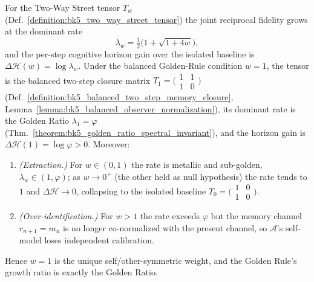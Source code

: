 \begin{theorem}
\label{theorem:bk5_golden_rule_reciprocity}
For the Two-Way Street tensor $T_w$
(Def.~\ref{definition:bk5_two_way_street_tensor}) the joint reciprocal fidelity grows
at the dominant rate
\[
\lambda_w=\tfrac{1}{2}\big(1+\sqrt{1+4w}\big),
\]
and the per-step cognitive horizon gain over the isolated baseline is
$\Delta\mathcal{H}(w)=\log\lambda_w$. Under the balanced Golden-Rule condition
$w=1$, the tensor is the balanced two-step closure matrix
$T_1=\big(\begin{smallmatrix}1&1\\1&0\end{smallmatrix}\big)$
(Def.~\ref{definition:bk5_balanced_two_step_memory_closure},
Lemma~\ref{lemma:bk5_balanced_observer_normalization}), its dominant rate is the
Golden Ratio $\lambda_1=\varphi$
(Thm.~\ref{theorem:bk5_golden_ratio_spectral_invariant}), and the horizon gain is
$\Delta\mathcal{H}(1)=\log\varphi>0$. Moreover:
\begin{enumerate}
\item \emph{(Extraction.)} For $w\in(0,1)$ the rate is metallic and sub-golden,
$\lambda_w\in(1,\varphi)$; as $w\to 0^{+}$ (the other held as null hypothesis) the
rate tends to $1$ and $\Delta\mathcal{H}\to 0$, collapsing to the isolated baseline
$T_0=\big(\begin{smallmatrix}1&0\\1&0\end{smallmatrix}\big)$.
\item \emph{(Over-identification.)} For $w>1$ the rate exceeds $\varphi$ but the
memory channel $r_{n+1}=m_n$ is no longer co-normalized with the present channel, so
$\mathcal{A}$'s self-model loses independent calibration.
\end{enumerate}
Hence $w=1$ is the unique self/other-symmetric weight, and the Golden Rule's growth
ratio is exactly the Golden Ratio.
\end{theorem}

